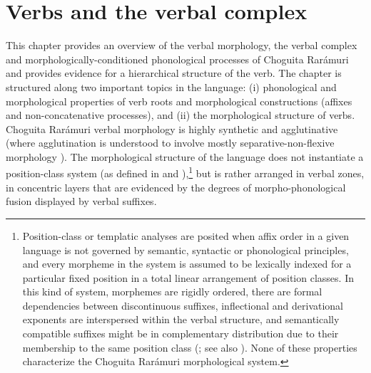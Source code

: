 \chapter{Verbs and the verbal complex}
\label{chap: verbal morphology}



This chapter provides an overview of the verbal morphology, the verbal complex and morphologically-conditioned phonological processes of Choguita Rarámuri and provides evidence for a hierarchical structure of the verb. The chapter is structured along two important topics in the language: (i) phonological and morphological properties of verb roots and morphological constructions (affixes and non-concatenative processes), and (ii) the morphological structure of verbs. Choguita Rarámuri verbal morphology is highly synthetic and agglutinative (where agglutination is understood to involve mostly separative-non-flexive morphology \parencite{bickel2007inflectional}). The morphological structure of the language does not instantiate a position-class system (as defined in \citealt{simpson1986pronominal} and \citealt{inkelas1993nimboran}),\footnote{Position-class or templatic analyses are posited when affix order in a given language is not governed by semantic, syntactic or phonological principles, and every
morpheme in the system is assumed to be lexically indexed for a particular fixed position in a total linear arrangement of position classes. In this kind of system, morphemes are rigidly ordered, there are formal dependencies between discontinuous suffixes, inflectional and derivational exponents are interspersed within the verbal structure, and semantically compatible suffixes might be in complementary distribution due to their membership to the same position class (\citealt{inkelas1993nimboran}; see also \citealt{rice2011principles}). None of these properties characterize the Choguita Rarámuri morphological system.} but is rather arranged in verbal zones, in concentric layers that are evidenced by the degrees of morpho-phonological fusion displayed by verbal suffixes.

